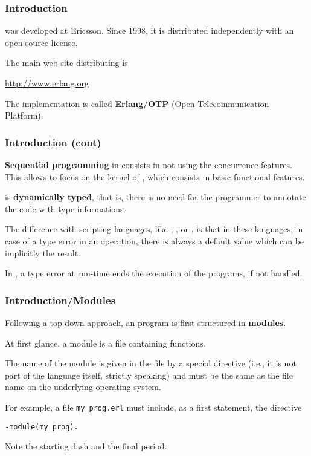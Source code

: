 
%
\begin{frame}
\frametitle{Introduction}

\Erlang was developed at Ericsson. Since 1998, it is distributed
independently with an open source license.

\bigskip

The main web site distributing \Erlang is
\begin{center}
\url{http://www.erlang.org}
\end{center}
The implementation is called \textbf{Erlang/OTP} (Open
Telecommunication Platform).

\end{frame}

%
\begin{frame}
\frametitle{Introduction (cont)}

\textbf{Sequential programming} in \Erlang consists in not using the
concurrence features. This allows to focus on the kernel of \Erlang,
which consists in basic functional features.

\bigskip

\Erlang is \textbf{dynamically typed}, that is, there is no need for
the programmer to annotate the code with type informations. 

\bigskip

The difference with scripting languages, like \Bash, \Perl, \Python or
\Ruby, is that in these languages, in case of a type error in an
operation, there is always a default value which can be implicitly the
result.

\bigskip

In \Erlang, a type error at run-time ends the execution of the
programs, if not handled.

\end{frame}

%
\begin{frame}[containsverbatim]
\frametitle{Introduction/Modules}

Following a top-down approach, an \Erlang program is first
structured in \textbf{modules}.

\bigskip

At first glance, a module is a file containing \Erlang functions. 

\bigskip

The name of the module is given in the file by a special directive
(i.e., it is not part of the language itself, strictly speaking) and
must be the same as the file name on the underlying operating system.

\bigskip

For example, a file \texttt{my\_prog.erl} must include, as a first
statement, the directive
\begin{verbatim}
-module(my_prog).
\end{verbatim}
Note the starting dash and the final period.

\end{frame}


